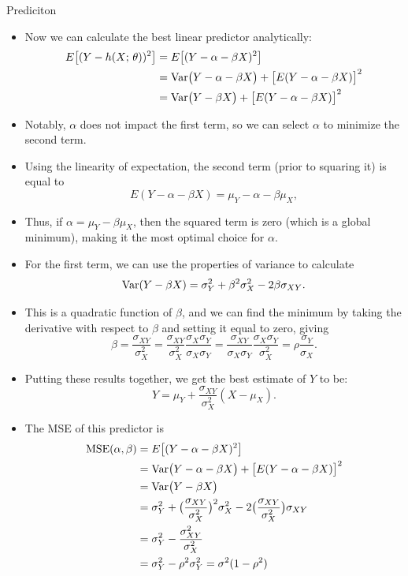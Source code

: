 \begin{frame}[allowframebreaks]{Prediciton}
\begin{itemize}
    \item Now we can calculate the best linear predictor analytically:
    \begin{align*}
      E\big[(Y - h(X;\, \theta))^2\big] &= E\big[(Y - \alpha - \beta X)^2\big] \\
      &= \mathrm{Var}\big(Y - \alpha - \beta X\big) + \big[E(Y - \alpha - \beta X)\big]^2 \\
      &= \mathrm{Var}\big(Y - \beta X\big) + \big[E(Y - \alpha - \beta X)\big]^2
    \end{align*}
    \item Notably, $\alpha$ does not impact the first term, so we can select $\alpha$ to minimize the second term.
    \item Using the linearity of expectation, the second term (prior to squaring it) is equal to
    $$
    E(Y - \alpha - \beta X) = \mu_Y - \alpha - \beta \mu_X, 
    $$
    \item Thus, if $\alpha = \mu_Y - \beta \mu_X$, then the squared term is zero (which is a global minimum), making it the most optimal choice for $\alpha$.
    \item For the first term, we can use the properties of variance to calculate
    $$
    \mathrm{Var}(Y - \beta X) = \sigma_Y^2 + \beta^2 \sigma^2_X - 2\beta \sigma_{XY}.
    $$
    \item This is a quadratic function of $\beta$, and we can find the minimum by taking the derivative with respect to $\beta$ and setting it equal to zero, giving
    $$
    \beta = \frac{\sigma_{XY}}{\sigma^2_X} = \frac{\sigma_{XY}}{\sigma^2_X}\frac{\sigma_X\sigma_Y}{\sigma_X\sigma_Y} = \frac{\sigma_{XY}}{\sigma_X\sigma_Y}\frac{\sigma_X\sigma_Y}{\sigma^2_X} = \rho \frac{\sigma_Y}{\sigma_X}.
    $$
    \framebreak
    
    \item Putting these results together, we get the best estimate of $Y$ to be:
    $$
    \hat{Y} = \mu_Y + \frac{\sigma_{XY}}{\sigma^2_X}(X - \mu_X).
    $$
    \item The MSE of this predictor is
    \begin{align*}
      \text{MSE}(\alpha, \beta) &= E\big[(Y - \alpha - \beta X)^2\big] \\
      &= \mathrm{Var}\big(Y - \alpha - \beta X\big) + \big[E(Y - \alpha - \beta X)\big]^2 \\
      &= \mathrm{Var}\big(Y - \beta X\big) \\
      &= \sigma_Y^2 + \big(\frac{\sigma_{XY}}{\sigma^2_X}\big)^2 \sigma^2_X - 2\big(\frac{\sigma_{XY}}{\sigma^2_X}\big) \sigma_{XY} \\
      &= \sigma^2_Y - \frac{\sigma^2_{XY}}{\sigma^2_X} \\
      &= \sigma^2_Y - \rho^2\sigma^2_Y = \sigma^2(1 - \rho^2)
    \end{align*}
    

\end{itemize}
\end{frame}

